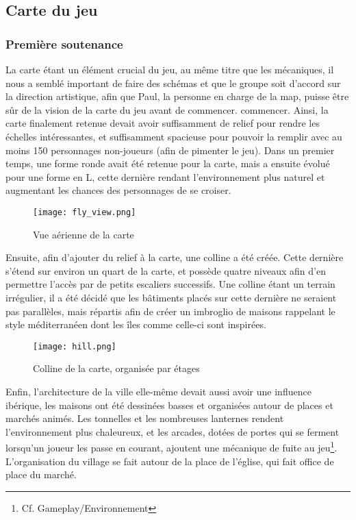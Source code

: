 \subsection{Carte du jeu}

\subsubsection{Première soutenance}

    La carte étant un élément crucial du jeu, au même titre que les mécaniques, 
    il nous a semblé important de faire des schémas et que le groupe soit d'accord sur la direction artistique,
    afin que Paul, la personne en charge de la map, puisse être sûr de la vision de la carte du jeu avant de commencer.
    commencer. Ainsi, la carte finalement retenue devait avoir suffisamment de 
    relief pour rendre les échelles intéressantes, et suffisamment spacieuse pour 
    pouvoir la remplir avec au moins 150 personnages non-joueurs (afin de pimenter le jeu).
    Dans un premier temps, une forme ronde avait été retenue pour la carte, mais 
    a ensuite évolué pour une forme en L, cette dernière rendant l’environnement 
    plus naturel et augmentant les chances des personnages de se croiser.


    \begin{figure}[hbt!]
        \centering
        \texttt{[image: fly\_view.png]}
        \caption{Vue aérienne de la carte}
    \end{figure}

    Ensuite, afin d’ajouter du relief à la carte, une colline a été créée. 
    Cette dernière s’étend sur environ un quart de la carte, et possède quatre 
    niveaux afin d’en permettre l’accès par de petits escaliers successifs. 
    Une colline étant un terrain irrégulier, il a été décidé que les bâtiments 
    placés sur cette dernière ne seraient pas parallèles, mais répartis afin de 
    créer un imbroglio de maisons rappelant le style méditerranéen dont les îles 
    comme celle-ci sont inspirées.


    \begin{figure}[hbt!]
        \centering
        \texttt{[image: hill.png]}
        \caption{Colline de la carte, organisée par étages}
    \end{figure}


    Enfin, l’architecture de la ville elle-même devait aussi avoir une influence 
    ibérique, les maisons ont été dessinées basses et organisées autour de places et 
    marchés animés. Les tonnelles et les nombreuses lanternes rendent l’environnement 
    plus chaleureux, et les arcades, dotées de portes qui se ferment lorsqu’un joueur 
    les passe en courant, ajoutent une mécanique de fuite au jeu\footnote{Cf. Gameplay/Environnement}. L’organisation du 
    village se fait autour de la place de l’église, qui fait office de place du marché.\\


